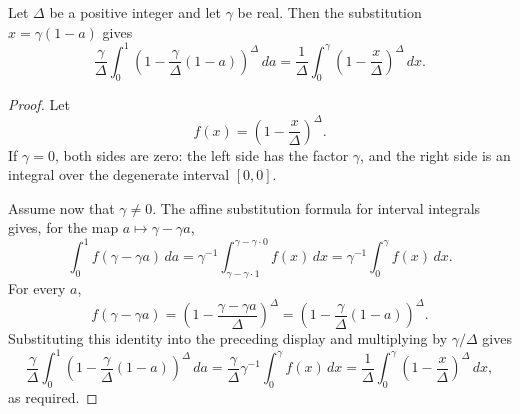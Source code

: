\begin{helper}
Let $\Delta$ be a positive integer and let $\gamma$ be real.  Then the
substitution $x=\gamma(1-a)$ gives
\[
\frac{\gamma}{\Delta}\int_0^1
\left(1-\frac{\gamma}{\Delta}(1-a)\right)^\Delta\,da
=
\frac1\Delta\int_0^\gamma
\left(1-\frac{x}{\Delta}\right)^\Delta\,dx .
\]
\end{helper}
\begin{proof}
Let
\[
f(x)=\left(1-\frac{x}{\Delta}\right)^\Delta .
\]
If $\gamma=0$, both sides are zero: the left side has the factor $\gamma$,
and the right side is an integral over the degenerate interval $[0,0]$.

Assume now that $\gamma\ne0$.  The affine substitution formula for interval
integrals gives, for the map $a\mapsto \gamma-\gamma a$,
\[
\int_0^1 f(\gamma-\gamma a)\,da
=
\gamma^{-1}\int_{\gamma-\gamma\cdot 1}^{\gamma-\gamma\cdot 0} f(x)\,dx
=
\gamma^{-1}\int_0^\gamma f(x)\,dx .
\]
For every $a$,
\[
f(\gamma-\gamma a)
=\left(1-\frac{\gamma-\gamma a}{\Delta}\right)^\Delta
=\left(1-\frac{\gamma}{\Delta}(1-a)\right)^\Delta .
\]
Substituting this identity into the preceding display and multiplying by
$\gamma/\Delta$ gives
\[
\frac{\gamma}{\Delta}\int_0^1
\left(1-\frac{\gamma}{\Delta}(1-a)\right)^\Delta\,da
=
\frac{\gamma}{\Delta}\gamma^{-1}\int_0^\gamma f(x)\,dx
=
\frac1\Delta\int_0^\gamma
\left(1-\frac{x}{\Delta}\right)^\Delta\,dx,
\]
as required.
\end{proof}
